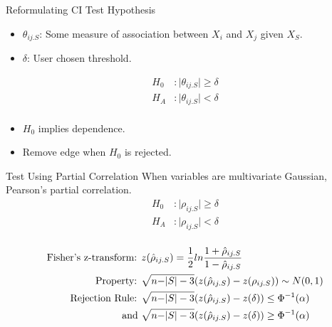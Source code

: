 \documentclass{beamer}
\begin{document}
\begin{frame}{Reformulating CI Test Hypothesis}
	\begin{itemize}
		\item $ \theta_{ij.S} $: Some measure of association between $ X_i $ and $ X_j $ given $ X_S $.
		\item $ \delta $: User chosen threshold.
	\end{itemize}

	\begin{equation*}
		\begin{split}
			H_0&: \rvert \theta_{ij.S} \rvert \ge \delta \\
			H_A&: \rvert \theta_{ij.S} \rvert < \delta \\
		\end{split}
	\end{equation*}

	\begin{itemize}
		\item $ H_0 $ implies dependence.
		\item Remove edge when $ H_0 $ is rejected.
	\end{itemize}
\end{frame}

\begin{frame}{Test Using Partial Correlation}
	\center When variables are multivariate Gaussian, Pearson's partial correlation.
	\vspace{1em}
	\begin{equation*}
		\begin{split}
			H_0&: \rvert \rho_{ij.S} \rvert \ge \delta \\
			H_A&: \rvert \rho_{ij.S} \rvert < \delta \\
		\end{split}
	\end{equation*}

	\begin{equation*}
		\begin{split}
			\textnormal{Fisher's z-transform: }& z(\hat{\rho}_{ij.S}) = \frac{1}{2} ln \frac{1+\hat{\rho}_{ij.S}}{1 - \hat{\rho}_{ij.S}} \\
			\textnormal{Property: }& \sqrt{n - \rvert S \rvert - 3}(z(\hat{\rho}_{ij.S}) - z(\rho_{ij.S})) \sim N(0, 1) \\
			\textnormal{Rejection Rule: }& \sqrt{n - \rvert S \rvert - 3}(z(\hat{\rho}_{ij.S}) - z(\delta)) \le \Phi^{-1}(\alpha) \\
			\textnormal{and } & \sqrt{n - \rvert S \rvert - 3}(z(\hat{\rho}_{ij.S}) - z(\delta)) \ge \Phi^{-1}(\alpha)
		\end{split}
	\end{equation*}
\end{frame}
\end{document}
